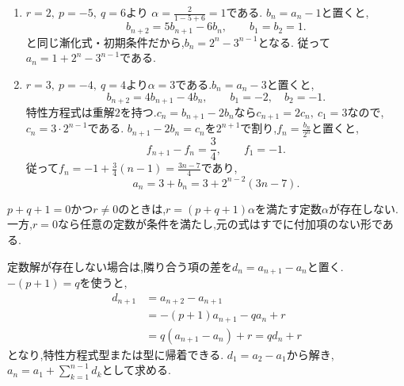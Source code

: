 \noindent{}\par\nobreak
\begin{enumerate}[label=(\arabic*),parsep=3pt,format=\bookitemlink{example-three-term-2}{solution}{problem}]
  \item $r=2,\ p=-5,\ q=6$より\BookMathLayout{}{\\}%
    $\alpha=\frac{2}{1-5+6}=1$である.
    $b_n=a_n-1$と置くと,
    \[
      b_{n+2}=5b_{n+1}-6b_n,\qquad b_1=b_2=1.
    \]
    と同じ漸化式・初期条件だから,$b_n=2^n-3^{n-1}$となる.
    従って$a_n=1+2^n-3^{n-1}$である.
  \item $r=3,\ p=-4,\ q=4$より$\alpha=3$である.$b_n=a_n-3$と置くと,
    \[
      b_{n+2}=4b_{n+1}-4b_n,\qquad b_1=-2,\quad b_2=-1.
    \]
    特性方程式は重解$2$を持つ.$c_n=b_{n+1}-2b_n$なら$c_{n+1}=2c_n,\ c_1=3$なので,$c_n=3\cdot2^{n-1}$である.
    $b_{n+1}-2b_n=c_n$を$2^{n+1}$で割り,$f_n=\frac{b_n}{2^n}$と置くと,
    \[
      f_{n+1}-f_n=\frac34,\qquad f_1=-1.
    \]
    従って$f_n=-1+\frac34(n-1)=\frac{3n-7}{4}$であり,
    \[
      a_n=3+b_n=3+2^{n-2}(3n-7).
    \]
\end{enumerate}



$p+q+1=0$かつ$r\ne0$のときは,$r=(p+q+1)\alpha$を満たす定数$\alpha$が存在しない.
一方,$r=0$なら任意の定数が条件を満たし,元の式はすでに付加項のない形である.

定数解が存在しない場合は,隣り合う項の差を$d_n=a_{n+1}-a_n$と置く.
$-(p+1)=q$を使うと,
\[
  \begin{aligned}
    d_{n+1}&=a_{n+2}-a_{n+1}\\
    &=-(p+1)a_{n+1}-qa_n+r\\
    &=q(a_{n+1}-a_n)+r=qd_n+r
  \end{aligned}
\]
となり,特性方程式型または型に帰着できる.
$d_1=a_2-a_1$から解き,$a_n=a_1+\sum_{k=1}^{n-1}d_k$として求める.
